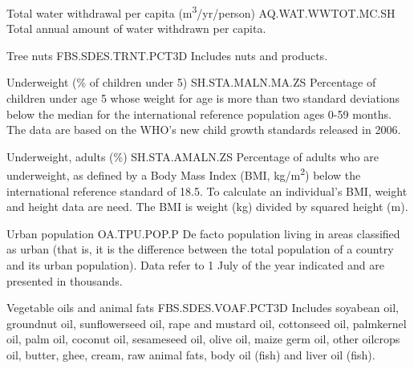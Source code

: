 \begin{MetadataCollection}
\begin{metadata}{ Total water withdrawal per capita (m\textsuperscript{3}/yr/person) }{ AQ.WAT.WWTOT.MC.SH }
Total annual amount of water withdrawn per capita. 
\end{metadata}

\begin{metadata}{ Tree nuts }{ FBS.SDES.TRNT.PCT3D }
Includes nuts and products. 
\end{metadata}

\begin{metadata}{ Underweight (\% of children under 5) }{ SH.STA.MALN.MA.ZS }
Percentage of children under age 5 whose weight for age is more than two standard deviations below the median for the international reference population ages 0-59 months. The data are based on the WHO's new child growth standards released in 2006. 
\end{metadata}

\begin{metadata}{ Underweight, adults (\%) }{ SH.STA.AMALN.ZS }
Percentage of adults who are underweight, as defined by a Body Mass Index (BMI, kg/m\textsuperscript{2}) below the international reference standard of 18.5. To calculate an individual's BMI, weight and height data are need.  The BMI is weight (kg) divided by squared height (m). 
\end{metadata}

\begin{metadata}{ Urban population }{ OA.TPU.POP.P }
De facto population living in areas classified as urban (that is, it is the difference between the total population of a country and its urban population). Data refer to 1 July of the year indicated and are presented in thousands. 
\end{metadata}

\begin{metadata}{ Vegetable oils and animal fats }{ FBS.SDES.VOAF.PCT3D }
Includes soyabean oil, groundnut oil, sunflowerseed oil, rape and mustard oil, cottonseed oil, palmkernel oil, palm oil, coconut oil, sesameseed oil, olive oil, maize germ oil, other oilcrops oil, butter, ghee, cream, raw animal fats, body oil (fish) and liver oil (fish). 
\end{metadata}


\end{MetadataCollection}
